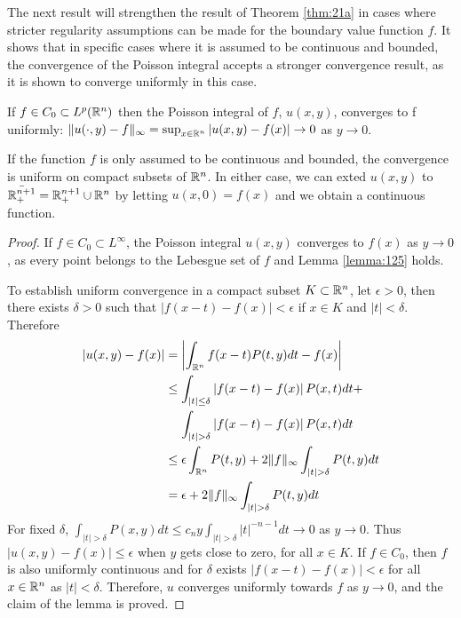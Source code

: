 The next result will strengthen the result of Theorem \ref{thm:21a} in cases where stricter regularity assumptions can be made for the boundary value function $f$. It shows that in specific cases where it is assumed to be continuous and bounded, the convergence of the Poisson integral accepts a stronger convergence result, as it is shown to converge uniformly in this case.

\begin{theorem}\label{thm:21b}
    If $f\in C_0\subset L^p(\mathbb R^n)$ then the Poisson integral of $f$, $u(x,y)$, converges to f uniformly: $\|u(\cdot,y)-f\|_\infty=\sup_{x\in\mathbb R^n}|u(x,y)-f(x)|\rightarrow0$ as $y\rightarrow0$. 
    
    If the function $f$ is only assumed to be continuous and bounded, the convergence is uniform on compact subsets of $\mathbb R^n$. In either case, we can exted $u(x,y)$ to $\Bar{\mathbb R^{n+1}_+}=\mathbb R_+^{n+1}\cup\mathbb R^n$ by letting $u(x,0)=f(x)$ and we obtain a continuous function.
\end{theorem}
\begin{proof}
    If $f\in C_0\subset L^\infty$, the Poisson integral $u(x,y)$ converges to $f(x)$ as $y\rightarrow0$, as every point belongs to the Lebesgue set of $f$ and Lemma \ref{lemma:125} holds.

    To establish uniform convergence in a compact subset $K\subset\mathbb R^n$, let $\epsilon>0$, then there exists $\delta>0$ such that $|f(x-t)-f(x)|<\epsilon$ if $x\in K$ and $|t|<\delta$. Therefore
    \begin{align*}
        |u(x,y)-f(x)|&=\left|\int_{\RR^n}f(x-t)P(t,y)dt- f(x) \right| \\
        &\leq\int_{|t|\leq\delta}\left|f(x-t)-f(x)\right|P(x,t)dt+ \\
        &\quad\,\int_{|t|>\delta}\left|f(x-t)-f(x)\right|P(x,t)dt \\
        &\leq\epsilon\int_{\RR^n}P(t,y)+2\|f\|_\infty\int_{|t|>\delta}P(t,y)dt \\
        &=\epsilon+2\|f\|_\infty\int_{|t|>\delta}P(t,y)dt
    \end{align*}
    For fixed $\delta$, $\int_{|t|>\delta}P(x,y)dt\leq c_ny\int_{|t|>\delta}|t|^{-n-1}dt\rightarrow0$ as $y\rightarrow0$. Thus $|u(x,y)-f(x)|\leq\epsilon$ when $y$ gets close to zero, for all $x\in K$. If $f\in C_0$, then $f$ is also uniformly continuous and for $\delta$ exists $|f(x-t)-f(x)|<\epsilon$ for all $x\in\mathbb R^n$ as $|t|<\delta$. Therefore, $u$ converges uniformly towards $f$ as $y\rightarrow0$, and the claim of the lemma is proved.
\end{proof}


